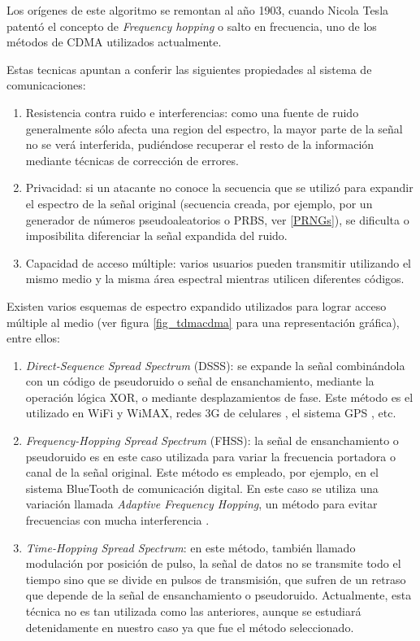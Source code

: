 Los orígenes de este algoritmo se remontan al año 1903, cuando Nicola Tesla patentó el concepto de \textit{Frequency hopping} o salto en frecuencia, uno de los métodos de CDMA utilizados actualmente.

Estas tecnicas apuntan a conferir las siguientes propiedades al sistema de comunicaciones:
\begin{enumerate} 
\item Resistencia contra ruido e interferencias: como una fuente de ruido generalmente sólo afecta una region del espectro, la mayor parte de la señal no se verá interferida, pudiéndose recuperar el resto de la información mediante técnicas de corrección de errores.
\item Privacidad: si un atacante no conoce la secuencia que se utilizó para expandir el espectro de la señal original (secuencia creada, por ejemplo, por un generador de números pseudoaleatorios o PRBS, ver \ref{PRNGs}), se dificulta o imposibilita diferenciar la señal expandida del ruido.
\item Capacidad de acceso múltiple: varios usuarios pueden transmitir utilizando el mismo medio y la misma área espectral mientras utilicen diferentes códigos.
\end{enumerate} 

Existen varios esquemas de espectro expandido utilizados para lograr acceso múltiple al medio (ver figura \ref{fig_tdmacdma} para una representación gráfica), entre ellos:
\begin{enumerate} 
\item \textit{Direct-Sequence Spread Spectrum} (DSSS): se expande la señal combinándola con un código de pseudoruido o señal de ensanchamiento, mediante la operación lógica XOR, o mediante desplazamientos de fase. Este método es el utilizado en WiFi y WiMAX, redes 3G de celulares \cite{dixon1994spread}, el sistema GPS \cite{kaplan2005understanding}, etc.
\item \textit{Frequency-Hopping Spread Spectrum} (FHSS): la señal de ensanchamiento o pseudoruido es en este caso utilizada para variar la frecuencia portadora o canal de la señal original. Este método es empleado, por ejemplo, en el sistema BlueTooth de comunicación digital. En este caso se utiliza una variación llamada \textit{Adaptive Frequency Hopping}, un método para evitar frecuencias con mucha interferencia \cite{golmie2003bluetooth}.
\item \textit{Time-Hopping Spread Spectrum}: en este método, también llamado modulación por posición de pulso, la señal de datos no se transmite todo el tiempo sino que se divide en pulsos de transmisión, que sufren de un retraso que depende de la señal de ensanchamiento o pseudoruido. Actualmente, esta técnica no es tan utilizada como las anteriores, aunque se estudiará detenidamente en nuestro caso ya que fue el método seleccionado.
\end{enumerate} 

